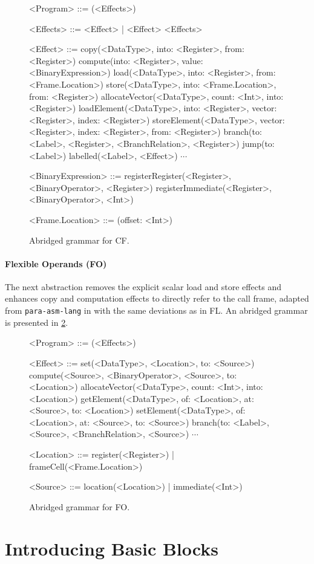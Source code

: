 \documentclass[main.tex]{subfiles}
\begin{document}
\begin{figure}[ht]
	\begin{grammar}
		
		<Program> ::= (<Effects>)
		
		<Effects> ::= <Effect> | <Effect> <Effects>
		
		<Effect> ::= copy(<DataType>, into: <Register>, from: <Register>)
			\alt compute(into: <Register>, value: <BinaryExpression>)
			\alt load(<DataType>, into: <Register>, from: <Frame.Location>)
			\alt store(<DataType>, into: <Frame.Location>, from: <Register>)
			\alt allocateVector(<DataType>, count: <Int>, into: <Register>)
			\alt loadElement(<DataType>, into: <Register>, vector: <Register>, index: <Register>)
			\alt storeElement(<DataType>, vector: <Register>, index: <Register>, from: <Register>)
			\alt branch(to: <Label>, <Register>, <BranchRelation>, <Register>)
			\alt jump(to: <Label>)
			\alt labelled(<Label>, <Effect>)
			\alt $\cdots$
		
		<BinaryExpression> ::= registerRegister(<Register>, <BinaryOperator>, <Register>)
			\alt registerImmediate(<Register>, <BinaryOperator>, <Int>)
		
		<Frame.Location> ::= (offset: <Int>)
		
	\end{grammar}
	\caption{Abridged grammar for CF.}
	\label{bnf:cf}
\end{figure}

\paragraph{Flexible Operands (FO)} The next abstraction removes the explicit scalar load and store effects and enhances copy and computation effects to directly refer to the call frame, adapted from \texttt{para-asm-lang} in \cite{:compcourse} with the same deviations as in FL. An abridged grammar is presented in \cref{bnf:fo}.

\begin{figure}[ht]
	\begin{grammar}
		
		<Program> ::= (<Effects>)
		
		<Effect> ::= set(<DataType>, <Location>, to: <Source>)
			\alt compute(<Source>, <BinaryOperator>, <Source>, to: <Location>)
			\alt allocateVector(<DataType>, count: <Int>, into: <Location>)
			\alt getElement(<DataType>, of: <Location>, at: <Source>, to: <Location>)
			\alt setElement(<DataType>, of: <Location>, at: <Source>, to: <Source>)
			\alt branch(to: <Label>, <Source>, <BranchRelation>, <Source>)
			\alt $\cdots$
		
		<Location> ::= register(<Register>) | frameCell(<Frame.Location>)
		
		<Source> ::= location(<Location>) | immediate(<Int>)
		
	\end{grammar}
	\caption{Abridged grammar for FO.}
	\label{bnf:fo}
\end{figure}

\section{Introducing Basic Blocks}


\biblio{}
\onlyinsubfile{\glsaddall\printglossaries}
\end{document}
